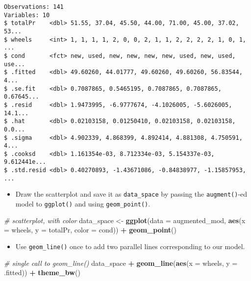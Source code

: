 \documentclass[]{book}
\newenvironment{Shaded}{\begin{snugshade}}{\end{snugshade}}
\newcommand{\KeywordTok}[1]{\textcolor[rgb]{0.13,0.29,0.53}{\textbf{#1}}}
\newcommand{\DataTypeTok}[1]{\textcolor[rgb]{0.13,0.29,0.53}{#1}}
\newcommand{\StringTok}[1]{\textcolor[rgb]{0.31,0.60,0.02}{#1}}
\newcommand{\CommentTok}[1]{\textcolor[rgb]{0.56,0.35,0.01}{\textit{#1}}}
\newcommand{\OperatorTok}[1]{\textcolor[rgb]{0.81,0.36,0.00}{\textbf{#1}}}
\newcommand{\NormalTok}[1]{#1}
\providecommand{\tightlist}{%
  \setlength{\itemsep}{0pt}\setlength{\parskip}{0pt}}
\begin{document}
\begin{verbatim}
Observations: 141
Variables: 10
$ totalPr    <dbl> 51.55, 37.04, 45.50, 44.00, 71.00, 45.00, 37.02, 53...
$ wheels     <int> 1, 1, 1, 1, 2, 0, 0, 2, 1, 1, 2, 2, 2, 2, 1, 0, 1, ...
$ cond       <fct> new, used, new, new, new, new, used, new, used, use...
$ .fitted    <dbl> 49.60260, 44.01777, 49.60260, 49.60260, 56.83544, 4...
$ .se.fit    <dbl> 0.7087865, 0.5465195, 0.7087865, 0.7087865, 0.67645...
$ .resid     <dbl> 1.9473995, -6.9777674, -4.1026005, -5.6026005, 14.1...
$ .hat       <dbl> 0.02103158, 0.01250410, 0.02103158, 0.02103158, 0.0...
$ .sigma     <dbl> 4.902339, 4.868399, 4.892414, 4.881308, 4.750591, 4...
$ .cooksd    <dbl> 1.161354e-03, 8.712334e-03, 5.154337e-03, 9.612441e...
$ .std.resid <dbl> 0.40270893, -1.43671086, -0.84838977, -1.15857953, ...
\end{verbatim}

\begin{itemize}
\tightlist
\item
  Draw the scatterplot and save it as \texttt{data\_space} by passing
  the \texttt{augment()}-ed model to \texttt{ggplot()} and using
  \texttt{geom\_point()}.
\end{itemize}

\begin{Shaded}
\begin{Highlighting}[]
\CommentTok{# scatterplot, with color}
\NormalTok{data_space <-}\StringTok{ }\KeywordTok{ggplot}\NormalTok{(}\DataTypeTok{data =}\NormalTok{ augmented_mod, }
                     \KeywordTok{aes}\NormalTok{(}\DataTypeTok{x =}\NormalTok{ wheels, }\DataTypeTok{y =}\NormalTok{ totalPr, }
                         \DataTypeTok{color =}\NormalTok{ cond)) }\OperatorTok{+}\StringTok{ }
\StringTok{  }\KeywordTok{geom_point}\NormalTok{()}
\end{Highlighting}
\end{Shaded}

\begin{itemize}
\tightlist
\item
  Use \texttt{geom\_line()} once to add two parallel lines corresponding
  to our model.
\end{itemize}

\begin{Shaded}
\begin{Highlighting}[]
\CommentTok{# single call to geom_line()}
\NormalTok{data_space }\OperatorTok{+}\StringTok{ }
\StringTok{  }\KeywordTok{geom_line}\NormalTok{(}\KeywordTok{aes}\NormalTok{(}\DataTypeTok{x =}\NormalTok{ wheels, }\DataTypeTok{y =}\NormalTok{ .fitted)) }\OperatorTok{+}\StringTok{ }
\StringTok{  }\KeywordTok{theme_bw}\NormalTok{()}
\end{Highlighting}
\end{Shaded}
\end{document}
